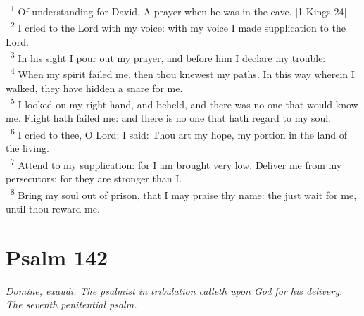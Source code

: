 \documentclass[a5paper,12pt]{article}
\begin{document}
\begin{multicols*}{2}
~\textsuperscript{1} Of understanding for David. A prayer when he was in the cave. [1 Kings 24]\\
~\textsuperscript{2} I cried to the Lord with my voice: with my voice I made supplication to the Lord.\\
~\textsuperscript{3} In his sight I pour out my prayer, and before him I declare my trouble:\\
~\textsuperscript{4} When my spirit failed me, then thou knewest my paths. In this way wherein I walked, they have hidden a snare for me.\\
~\textsuperscript{5} I looked on my right hand, and beheld, and there was no one that would know me. Flight hath failed me: and there is no one that hath regard to my soul.\\
~\textsuperscript{6} I cried to thee, O Lord: I said: Thou art my hope, my portion in the land of the living.\\
~\textsuperscript{7} Attend to my supplication: for I am brought very low. Deliver me from my persecutors; for they are stronger than I.\\
~\textsuperscript{8} Bring my soul out of prison, that I may praise thy name: the just wait for me, until thou reward me.\\

\section{Psalm 142}
\label{sec:org0ff01be}
\emph{Domine, exaudi. The psalmist in tribulation calleth upon God for his delivery. The seventh penitential psalm.}\\


\end{multicols*}
\end{document}
